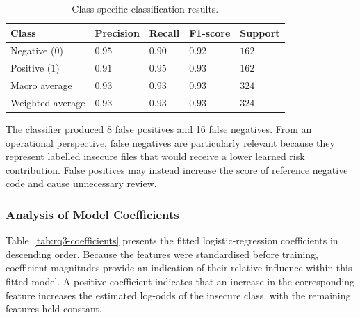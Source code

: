 \begin{table}[ht]
\centering
\caption{Class-specific classification results.}
\label{tab:rq3-class-report}
\begin{tabular}{|L{3.6cm}|C{2.5cm}|C{2.5cm}|C{2.5cm}|C{2.2cm}|}
\hline
\textbf{Class} & \textbf{Precision} & \textbf{Recall} & \textbf{F1-score} &
\textbf{Support} \\
\hline
Negative ($0$) & $0.95$ & $0.90$ & $0.92$ & $162$ \\
\hline
Positive ($1$) & $0.91$ & $0.95$ & $0.93$ & $162$ \\
\hline
Macro average & $0.93$ & $0.93$ & $0.93$ & $324$ \\
\hline
Weighted average & $0.93$ & $0.93$ & $0.93$ & $324$ \\
\hline
\end{tabular}
\end{table}

The classifier produced 8 false positives and 16 false negatives. From an operational
perspective, false negatives are particularly relevant because they represent labelled
insecure files that would receive a lower learned risk contribution. False positives may
instead increase the score of reference negative code and cause unnecessary review.

\subsubsection{Analysis of Model Coefficients}
\label{subsubsec:results-coefficients}

Table~\ref{tab:rq3-coefficients} presents the fitted logistic-regression coefficients in
descending order. Because the features were standardised before training, coefficient
magnitudes provide an indication of their relative influence within this fitted model. A
positive coefficient indicates that an increase in the corresponding feature increases
the estimated log-odds of the insecure class, with the remaining features held constant.

